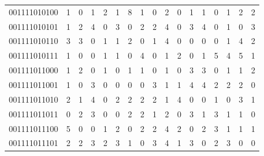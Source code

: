 \documentclass[10pt,a4paper]{article}
\begin{document}
\begin{longtable}{ |c|c|c|c|c|c|c|c|c|c|c|c|c|c|c|c|c| }
    001111010100              & 1                            & 0                                & 1                            & 2                              & 1   & 8   & 1   & 0   & 2   & 0   & 1   & 1   & 0   & 1   & 2   & 2   \\
    001111010101              & 1                            & 2                                & 4                            & 0                              & 3   & 0   & 2   & 2   & 4   & 0   & 3   & 4   & 0   & 1   & 0   & 3   \\
    001111010110              & 3                            & 3                                & 0                            & 1                              & 1   & 2   & 0   & 1   & 4   & 0   & 0   & 0   & 0   & 1   & 4   & 2   \\
    001111010111              & 1                            & 0                                & 0                            & 1                              & 1   & 0   & 4   & 0   & 1   & 2   & 0   & 1   & 5   & 4   & 5   & 1   \\
    001111011000              & 1                            & 2                                & 0                            & 1                              & 0   & 1   & 1   & 0   & 1   & 0   & 3   & 3   & 0   & 1   & 1   & 2   \\
    001111011001              & 1                            & 0                                & 3                            & 0                              & 0   & 0   & 0   & 3   & 1   & 1   & 4   & 4   & 2   & 2   & 2   & 0   \\
    001111011010              & 2                            & 1                                & 4                            & 0                              & 2   & 2   & 2   & 2   & 1   & 4   & 0   & 0   & 1   & 0   & 3   & 1   \\
    001111011011              & 0                            & 2                                & 3                            & 0                              & 0   & 2   & 2   & 1   & 2   & 0   & 3   & 1   & 3   & 1   & 1   & 0   \\
    001111011100              & 5                            & 0                                & 0                            & 1                              & 2   & 0   & 2   & 2   & 4   & 2   & 0   & 2   & 3   & 1   & 1   & 1   \\
    001111011101              & 2                            & 2                                & 3                            & 2                              & 3   & 1   & 0   & 3   & 4   & 1   & 3   & 0   & 2   & 3   & 0   & 0   \\

\end{longtable}
\end{document}
